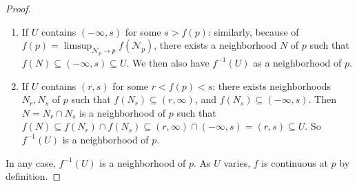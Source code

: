 \documentclass{treatise}
\begin{document}
\begin{proof}
\begin{enumerate}
    \item If $U$ contains $(-\infty, s)$ for some $s > f(p)$: similarly, because of $f(p) = \limsup_{\mathcal{N}_p \to p} f(\mathcal{N}_p)$, there exists a neighborhood $N$ of $p$ such that $f(N) \subseteq (-\infty, s) \subseteq U$. We then also have $f^{-1}(U)$ as a neighborhood of $p$.
    \item If $U$ contains $(r, s)$ for some $r < f(p) < s$: there exists neighborhoods $N_r, N_s$ of $p$ such that $f(N_r) \subseteq (r, \infty)$, and $f(N_s) \subseteq (-\infty, s)$. Then $N = N_r \cap N_s$ is a neighborhood of $p$ such that $f(N) \subseteq f(N_r) \cap f(N_s) \subseteq (r, \infty) \cap (-\infty, s) = (r, s) \subseteq U$. So $f^{-1}(U)$ is a neighborhood of $p$.
\end{enumerate}
In any case, $f^{-1}(U)$ is a neighborhood of $p$. As $U$ varies, $f$ is continuous at $p$ by definition.
\end{proof}

\newpage
\end{document}
